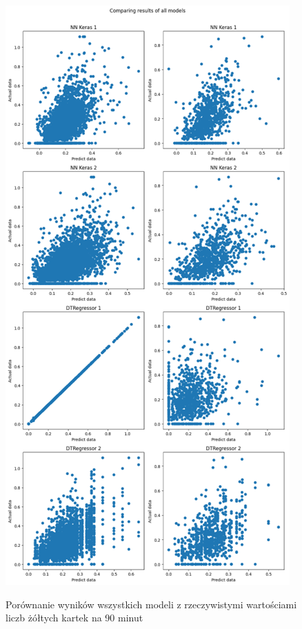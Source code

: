 \documentclass{article}
\begin{document}
\begin{figure}[H]
\begin{minipage}[b]{0.5\textwidth}
    \label{fig:obraz1}
  \end{minipage}%
  \begin{minipage}[b]{0.5\textwidth}
    \centering
    \includegraphics[width=\textwidth]{all_models_2.png}
    \label{fig:obraz2}
  \end{minipage}
  \captionsetup{justification=centering}
  \caption{Porównanie wyników wszystkich modeli z rzeczywistymi wartościami liczb żółtych kartek na 90 minut}
  \label{fig:all_models1}
\end{figure}
\end{document}
